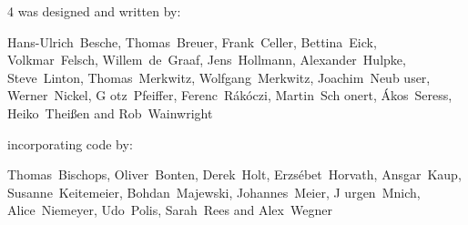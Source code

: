 {
{\GAP} 4 was designed and written by:

\obeylines
Hans-Ulrich~Besche, Thomas~Breuer, Frank~Celler, Bettina~Eick, Volkmar~Felsch, 
Willem~de~Graaf, Jens~Hollmann, Alexander~Hulpke, Steve~Linton, Thomas~Merkwitz,
Wolfgang~Merkwitz, Joachim~Neub{ u}ser, Werner~Nickel, G{ o}tz~Pfeiffer, 
Ferenc~R{\'a}k{\'o}czi, Martin~Sch{ o}nert, {\'A}kos~Seress,
Heiko~Thei{\ss}en and Rob~Wainwright

incorporating code by:

Thomas~Bischops, Oliver~Bonten, Derek~Holt, Erzs{\'e}bet~Horvath, Ansgar~Kaup, 
Susanne~Keitemeier, Bohdan~Majewski, Johannes~Meier, J{ u}rgen~Mnich, 
Alice~Niemeyer, Udo~Polis, Sarah~Rees and Alex~Wegner
}
